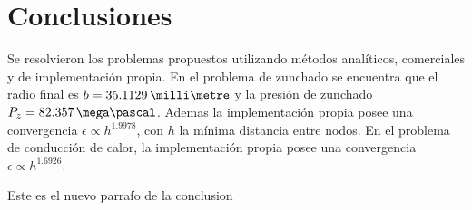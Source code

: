 \section{Conclusiones}
Se resolvieron los problemas propuestos utilizando m\'etodos anal\'iticos, comerciales y de implementaci\'on propia. En el problema de zunchado se encuentra que el radio final es $ b=35.1129\,\milli\metre $ y la presi\'on de zunchado $P_z=82.357\,\mega\pascal$. Ademas la implementaci\'on propia posee una convergencia $\epsilon\propto h^{1.9978}$, con $h$ la m\'inima distancia entre nodos. En el problema de conducci\'on de calor, la implementaci\'on propia posee una convergencia $\epsilon\propto h^{1.6926}$.

Este es el nuevo parrafo de la conclusion